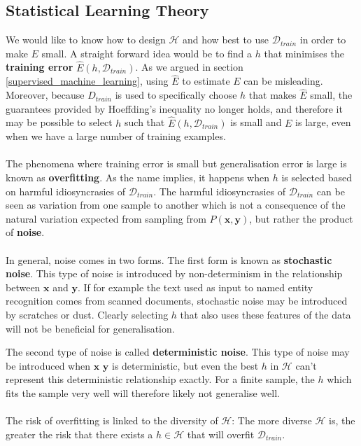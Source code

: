 \subsection{Statistical Learning Theory}
\label{statistical_learning_theory}
We would like to know how to design $\mathcal{H}$ and how best to use $\mathcal{D}_{train}$ in order to make $E$ small. A straight forward idea would be to find a $h$ that minimises the \textbf{training error} $\hat{E}(h, \mathcal{D}_{train})$. As we argued in section \ref{supervised_machine_learning}, using $\hat{E}$ to estimate $E$ can be misleading. Moreover, because $D_{train}$ is used to specifically choose $h$ that makes $\hat{E}$ small, the guarantees provided by Hoeffding's inequality no longer holds, and therefore it may be possible to select $h$ such that $\hat{E}(h, \mathcal{D}_{train})$ is small and $E$ is large, even when we have a large number of training examples.
\\\\
The phenomena where training error is small but generalisation error is large is known as \textbf{overfitting}. As the name implies, it happens when $h$ is selected based on harmful idiosyncrasies of $\mathcal{D}_{train}$. The harmful idiosyncrasies of $\mathcal{D}_{train}$ can be seen as variation from one sample to another which is not a consequence of the natural variation expected from sampling from $P(\mathbf{x}, \mathbf{y})$, but rather the product of \textbf{noise}.
\\\\
In general, noise comes in two forms. The first form is known as \textbf{stochastic noise}. This type of noise is introduced by non-determinism in the relationship between $\mathbf{x}$ and $\mathbf{y}$. If for example the text used as input to named entity recognition comes from scanned documents, stochastic noise may be introduced by scratches or dust. Clearly selecting $h$ that also uses these features of the data will not be beneficial for generalisation.

The second type of noise is called \textbf{deterministic noise}. This type of noise may be introduced when $\mathbf{x}$ $\mathbf{y}$ is deterministic, but even the best $h$ in $\mathcal{H}$ can't represent this deterministic relationship exactly. For a finite sample, the $h$ which fits the sample very well will therefore likely not generalise well.
\\\\
The risk of overfitting is linked to the diversity of $\mathcal{H}$: The more diverse $\mathcal{H}$ is, the greater the risk that there exists a $h \in \mathcal{H}$ that will overfit $\mathcal{D}_{train}$.

